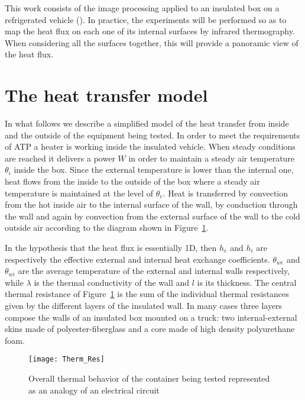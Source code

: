 \documentclass{tQRT2e}
\begin{document}
This work consists of the image processing applied to an insulated box on a refrigerated vehicle (\cite{bison1993automatic,bison2012geometrical}). In practice, the experiments will be performed so as to map the heat flux on each one of its internal surfaces by infrared thermography. When considering all the surfaces together, this will provide a panoramic view of the heat flux.


\section{The heat transfer model}

In what follows we describe a simplified model of the heat transfer from inside and the outside of the equipment being tested. In order to meet the requirements of ATP a heater is working inside the insulated vehicle. When steady conditions are reached it delivers a power $ W $ in order to maintain a steady air temperature $ \theta_i $ inside the box. Since the external temperature is lower than the internal one, heat flows from the inside to the outside of the box where a steady air temperature is maintained at the level of $ \theta_e $. Heat is transferred by convection from the hot inside air to the internal surface of the wall, by conduction through the wall and again by convection from the external surface of the wall to the cold outside air according to the diagram shown in Figure~\ref{Therm_Res}. 

In the hypothesis that the heat flux is essentially 1D,  then $ h_e $ and $ h_i $ are respectively the effective external and internal heat exchange coefficients. $ \theta_{we} $ and $ \theta_{wi} $ are the average temperature of the external and internal walls respectively, while $\lambda $ is the thermal conductivity of the wall and $l$ is its thickness. The central thermal resistance of Figure~\ref{Therm_Res} is the sum of the individual thermal resistances given by the different layers of the insulated wall. In many cases three layers compose the walls of an insulated box mounted on a truck: two internal-external skins made of polyester-fiberglass and a core made of high density polyurethane foam.
\begin{figure}[ht]
	\centering
	\texttt{[image: Therm\_Res]}
	\caption{Overall thermal behavior of the container being tested represented as an analogy of an electrical circuit}
	\label{Therm_Res}
\end{figure}
\end{document}
